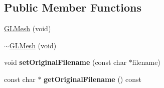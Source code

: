 \subsection*{Public Member Functions}
\begin{DoxyCompactItemize}
\item 
\hyperlink{classCartWheel_1_1GL_1_1GLMesh_a49c79d4aea35e7e8b28e14231ba2af50}{GLMesh} (void)
\item 
\hyperlink{classCartWheel_1_1GL_1_1GLMesh_a4a3c2a89f644114697c6bcaaa67e0f9f}{$\sim$GLMesh} (void)
\item 
\hypertarget{classCartWheel_1_1GL_1_1GLMesh_a234b6686bfb68a1a9cec3b1c8bec61fc}{
void {\bfseries setOriginalFilename} (const char $\ast$filename)}
\label{classCartWheel_1_1GL_1_1GLMesh_a234b6686bfb68a1a9cec3b1c8bec61fc}

\item 
\hypertarget{classCartWheel_1_1GL_1_1GLMesh_a7ddec897f31f7173020bd3d4dbfaa2c4}{
const char $\ast$ {\bfseries getOriginalFilename} () const }
\label{classCartWheel_1_1GL_1_1GLMesh_a7ddec897f31f7173020bd3d4dbfaa2c4}


\end{DoxyCompactItemize}
